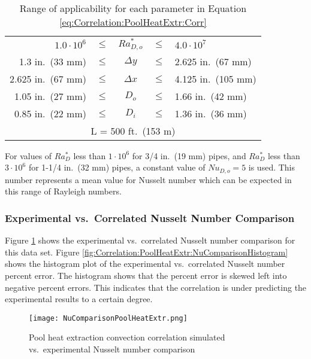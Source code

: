 	\begin{table}[h]
		\centering
		\caption[Range of applicability for pool heat extraction correlation]{Range of applicability for each parameter in Equation \ref{eq:Correlation:PoolHeatExtr:Corr}}
		\label{tab:Correlation:PoolHeatExtr:RangeOfApp}
		\begin{tabular}{r c c c l}
		$1.0\cdot10^6$ & $\le$ &  $Ra_{D,o}^*$ & $\le$  & $4.0\cdot10^7$ \\
		1.3 in.\ (33 mm) & $\le$ & $\Delta y$ & $\le$ & 2.625 in.\ (67 mm) \\
		2.625 in.\ (67 mm) & $\le$ & $\Delta x$ & $\le$ & 4.125 in.\ (105 mm) \\
		1.05 in.\ (27 mm) & $\le$ &  $D_o$ &  $\le$ & 1.66 in.\ (42 mm) \\
		0.85 in.\ (22 mm) & $\le$ &  $D_i$ &  $\le$ & 1.36 in.\ (36 mm) \\
		\multicolumn{5}{c}{L = 500 ft.\ (153 m)} \\
		\end{tabular}
	\end{table}
	
For values of $Ra_D^*$ less than $1\cdot10^6$ for 3/4 in.\ (19 mm) pipes, and $Ra_D^*$ less than $3\cdot10^6$ for 1-1/4 in.\ (32 mm) pipes, a constant value of $Nu_{D,o}=5$ is used. This number represents a mean value for Nusselt number which can be expected in this range of Rayleigh numbers.

\subsubsection{Experimental vs.\ Correlated Nusselt Number Comparison}

Figure \ref{fig:Correlation:PoolHeatExtr:NuComparison} shows the experimental vs.\ correlated Nusselt number comparison for this data set. Figure \ref{fig:Correlation:PoolHeatExtr:NuComparisonHistogram} shows the histogram plot of the experimental vs.\ correlated Nusselt number percent error. The histogram shows that the percent error is skewed left into negative percent errors. This indicates that the correlation is under predicting the experimental results to a certain degree.

\begin{figure}
	\centering
	\texttt{[image: NuComparisonPoolHeatExtr.png]}
	\caption{Pool heat extraction convection correlation simulated vs.\ experimental Nusselt number comparison}
	\label{fig:Correlation:PoolHeatExtr:NuComparison}
\end{figure}

